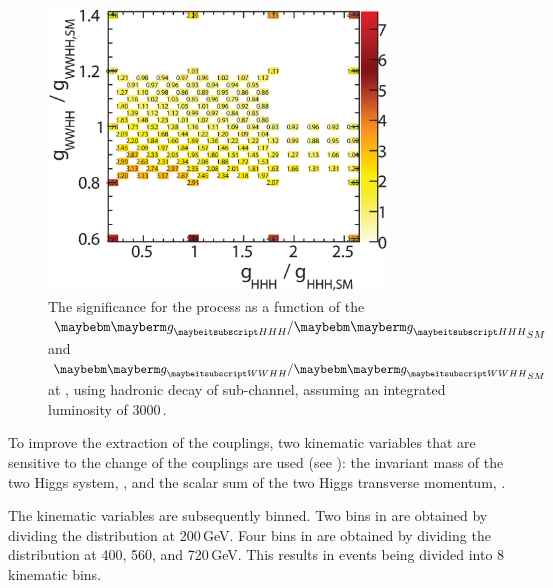 \begin{figure}[!htbp]
    \includegraphics[width=0.8\textwidth]{doubleHiggs/extraction/SignificanceBono3}
\caption{The significance for the \eeToHH process as a function of the $\gHHH/\gHHH_{SM}$ and  $\gWWHH/\gWWHH_{SM}$ at , using  hadronic \WW decay of \eeToHHbbWW sub-channel, assuming an integrated luminosity of  3000\,.}
   \label{fig:doubleHiggsCouplingSignificancebbWW}
\end{figure}


To improve the extraction of the couplings, two kinematic variables that are sensitive to the change of the couplings are used (see ): the invariant mass of the two Higgs system, \mhh, and the scalar sum of the two Higgs transverse momentum, \HT.

The kinematic variables are subsequently binned. Two bins in \HT are obtained by dividing the \HT distribution at 200\,GeV. Four bins in \mhh are obtained by dividing the \mhh distribution at 400, 560, and 720\,GeV. This results in events being divided into 8 kinematic bins.


